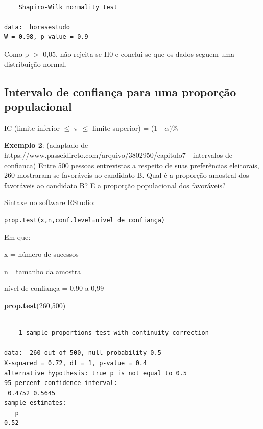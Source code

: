 \documentclass[12pt,brazil,]{book}
\newenvironment{Shaded}{\begin{snugshade}}{\end{snugshade}}
\newcommand{\DecValTok}[1]{\textcolor[rgb]{0.00,0.00,0.81}{#1}}
\newcommand{\KeywordTok}[1]{\textcolor[rgb]{0.13,0.29,0.53}{\textbf{#1}}}
\newcommand{\NormalTok}[1]{#1}
\begin{document}
\begin{verbatim}

    Shapiro-Wilk normality test

data:  horasestudo
W = 0.98, p-value = 0.9
\end{verbatim}

Como p \(>\) 0,05, não rejeita-se H0 e conclui-se que os dados seguem
uma distribuição normal.

\hypertarget{intervalo-de-confianca-para-uma-proporcao-populacional}{%
\subsection{Intervalo de confiança para uma proporção
populacional}\label{intervalo-de-confianca-para-uma-proporcao-populacional}}

IC (limite inferior \(\leq\) \(\pi\) \(\leq\) limite superior) = (1 -
\(\alpha\))\%

\textbf{Exemplo 2}: (adaptado de
\url{https://www.passeidireto.com/arquivo/3802950/capitulo7---intervalos-de-confianca})
Entre 500 pessoas entrevistas a respeito de suas preferências
eleitorais, 260 mostraram-se favoráveis ao candidato B. Qual é a
proporção amostral dos favoráveis ao candidato B? E a proporção
populacional dos favoráveis?

Sintaxe no software RStudio:

\texttt{prop.test(x,n,conf.level=nível\ de\ confiança)}

Em que:

x = número de sucessos

n= tamanho da amostra

nível de confiança = 0,90 a 0,99

\begin{Shaded}
\begin{Highlighting}[]
\KeywordTok{prop.test}\NormalTok{(}\DecValTok{260}\NormalTok{,}\DecValTok{500}\NormalTok{)}
\end{Highlighting}
\end{Shaded}

\begin{verbatim}

    1-sample proportions test with continuity correction

data:  260 out of 500, null probability 0.5
X-squared = 0.72, df = 1, p-value = 0.4
alternative hypothesis: true p is not equal to 0.5
95 percent confidence interval:
 0.4752 0.5645
sample estimates:
   p 
0.52 
\end{verbatim}
\end{document}
